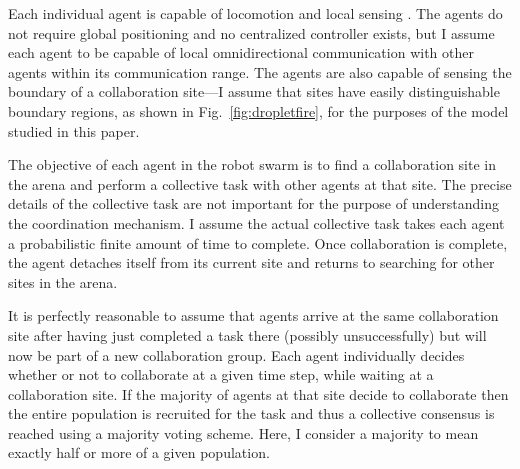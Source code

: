 \documentclass[defaultstyle,12pt]{thesis}
\begin{document}
Each individual agent is capable of locomotion \cite{Klingner2014} and local sensing \cite{Farrow2014}. The agents do not require global positioning and no centralized controller exists, but I assume each agent to be capable of local omnidirectional communication with other agents within its communication range. The agents are also capable of sensing the boundary of a collaboration site---I assume that sites have easily distinguishable boundary regions, as shown in Fig.~\ref{fig:dropletfire}, for the purposes of the model studied in this paper. 

The objective of each agent in the robot swarm is to find a collaboration site in the arena and perform a collective task with other agents at that site. The precise details of the collective task are not important for the purpose of understanding the coordination mechanism. I assume the actual collective task takes each agent a probabilistic finite amount of time to complete. Once collaboration is complete, the agent detaches itself from its current site and returns to searching for other sites in the arena. 

It is perfectly reasonable to assume that agents arrive at the same collaboration site after having just completed a task there (possibly unsuccessfully) but will now be part of a new collaboration group. Each agent individually decides whether or not to collaborate at a given time step, while waiting at a collaboration site. If the majority of agents at that site decide to collaborate then the entire population is recruited for the task and thus a collective consensus is reached using a majority voting scheme. Here, I consider a majority to mean exactly half or more of a given population. 
\end{document}

